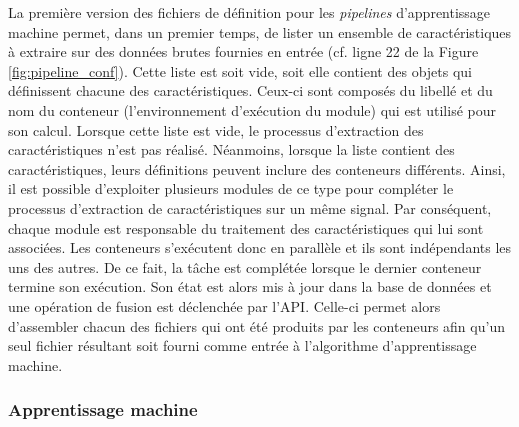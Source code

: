 La première version des fichiers de définition pour les \textit{pipelines} d'apprentissage machine permet, dans un premier temps, de lister un ensemble de caractéristiques à extraire sur des données brutes fournies en entrée (cf. ligne 22 de la Figure \ref{fig:pipeline_conf}). Cette liste est soit vide, soit elle contient des objets qui définissent chacune des caractéristiques. Ceux-ci sont composés du libellé et du nom du conteneur (l'environnement d'exécution du module) qui est utilisé pour son calcul. Lorsque cette liste est vide, le processus d'extraction des caractéristiques n'est pas réalisé. Néanmoins, lorsque la liste contient des caractéristiques, leurs définitions peuvent inclure des conteneurs différents. Ainsi, il est possible d'exploiter plusieurs modules de ce type pour compléter le processus d'extraction de caractéristiques sur un même signal. Par conséquent, chaque module est responsable du traitement des caractéristiques qui lui sont associées. Les conteneurs s'exécutent donc en parallèle et ils sont indépendants les uns des autres. De ce fait, la tâche est complétée lorsque le dernier conteneur termine son exécution. Son état est alors mis à jour dans la base de données et une opération de fusion est déclenchée par l'\acs{API}. Celle-ci permet alors d'assembler chacun des fichiers qui ont été produits par les conteneurs afin qu'un seul fichier résultant soit fourni comme entrée à l'algorithme d'apprentissage machine.

\subsubsection{Apprentissage machine}

